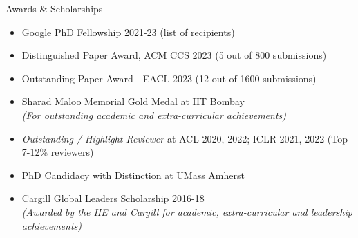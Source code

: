 \documentclass{resume} %
\begin{document}
\begin{rSection}{Awards \& Scholarships}
\vspace*{0.2in}
\begin{itemize}[leftmargin=*]
\setlength\itemsep{0.4em}
\item Google PhD Fellowship 2021-23 (\href{https://research.google/outreach/phd-fellowship/recipients/?category=2021}{list of recipients}) 
\item Distinguished Paper Award, ACM CCS 2023 (5 out of 800 submissions)
\item Outstanding Paper Award - EACL 2023 (12 out of 1600 submissions)
\item Sharad Maloo Memorial Gold Medal at IIT Bombay\\
\textit{(For outstanding academic and extra-curricular achievements)}
\item \emph{Outstanding / Highlight Reviewer} at ACL 2020, 2022; ICLR 2021, 2022  (Top 7-12\% reviewers)
\item PhD Candidacy with Distinction at UMass Amherst
\item Cargill Global Leaders Scholarship 2016-18 \\
\textit{(Awarded by the \href{https://en.wikipedia.org/wiki/Institute_of_International_Education}{IIE} and \href{https://en.wikipedia.org/wiki/Cargill}{Cargill} for academic, extra-curricular and leadership achievements)}
\end{itemize}
\end{rSection}

\vspace*{0.1in}
\end{document}
